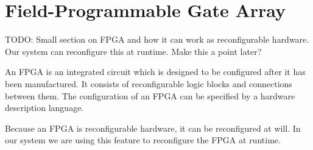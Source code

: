 \section{Field-Programmable Gate Array}
TODO: Small section on FPGA and how it can work as reconfigurable hardware. Our system can reconfigure this at runtime. Make this a point later?

An FPGA is an integrated circuit which is designed to be configured after it has been manufactured. It consists of reconfigurable logic blocks and connections between them. The configuration of an FPGA can be specified by a hardware description language.

Because an FPGA is reconfigurable hardware, it can be reconfigured at will. In our system we are using this feature to reconfigure the FPGA at runtime.
